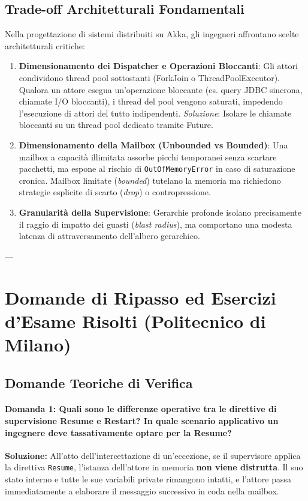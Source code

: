 \subsection{Trade-off Architetturali Fondamentali}
Nella progettazione di sistemi distribuiti su Akka, gli ingegneri affrontano scelte architetturali critiche:
\begin{enumerate}
    \item \textbf{Dimensionamento dei Dispatcher e Operazioni Bloccanti}: Gli attori condividono thread pool sottostanti (ForkJoin o ThreadPoolExecutor). Qualora un attore esegua un'operazione bloccante (es. query JDBC sincrona, chiamate I/O bloccanti), i thread del pool vengono saturati, impedendo l'esecuzione di attori del tutto indipendenti. \textit{Soluzione}: Isolare le chiamate bloccanti su un thread pool dedicato tramite Future.
    \item \textbf{Dimensionamento della Mailbox (Unbounded vs Bounded)}: Una mailbox a capacità illimitata assorbe picchi temporanei senza scartare pacchetti, ma espone al rischio di \texttt{OutOfMemoryError} in caso di saturazione cronica. Mailbox limitate (\textit{bounded}) tutelano la memoria ma richiedono strategie esplicite di scarto (\textit{drop}) o contropressione.
    \item \textbf{Granularità della Supervisione}: Gerarchie profonde isolano precisamente il raggio di impatto dei guasti (\textit{blast radius}), ma comportano una modesta latenza di attraversamento dell'albero gerarchico.
\end{enumerate}

---

\section{Domande di Ripasso ed Esercizi d'Esame Risolti (Politecnico di Milano)}

\subsection{Domande Teoriche di Verifica}

\paragraph{Domanda 1: Quali sono le differenze operative tra le direttive di supervisione Resume e Restart? In quale scenario applicativo un ingegnere deve tassativamente optare per la Resume?}
\textbf{Soluzione:}
All'atto dell'intercettazione di un'eccezione, se il supervisore applica la direttiva \texttt{Resume}, l'istanza dell'attore in memoria \textbf{non viene distrutta}. Il suo stato interno e tutte le sue variabili private rimangono intatti, e l'attore passa immediatamente a elaborare il messaggio successivo in coda nella mailbox.


